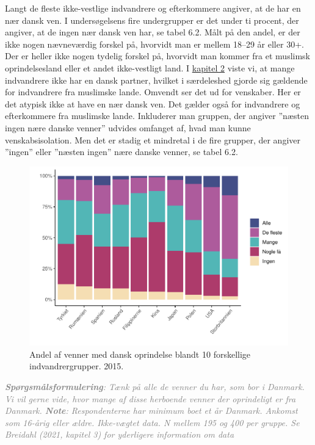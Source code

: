 \documentclass[
]{book}
\begin{document}
Langt de fleste ikke-vestlige indvandrere og efterkommere angiver, at de har en nær dansk ven. I undersøgelsens fire undergrupper er det under ti procent, der angiver, at de ingen nær dansk ven har, se tabel 6.2. Målt på den andel, er der ikke nogen nævneværdig forskel på, hvorvidt man er mellem 18--29 år eller 30+. Der er heller ikke nogen tydelig forskel på, hvorvidt man kommer fra et muslimsk oprindelsesland eller et andet ikke-vestligt land. I \hyperref[kap2]{kapitel 2} viste vi, at mange indvandrere ikke har en dansk partner, hvilket i særdeleshed gjorde sig gældende for indvandrere fra muslimske lande. Omvendt ser det ud for venskaber. Her er det atypisk ikke at have en nær dansk ven. Det gælder også for indvandrere og efterkommere fra muslimske lande. Inkluderer man gruppen, der angiver ''næsten ingen nære danske venner'' udvides omfanget af, hvad man kunne venskabsisolation. Men det er stadig et mindretal i de fire grupper, der angiver ''ingen'' eller ''næsten ingen'' nære danske venner, se tabel 6.2.

\newpage

\begin{figure}
\includegraphics[width=1\linewidth]{en-befolkning-blander-sig_files/figure-latex/fig-6-3-1} \caption{Andel af venner med dansk oprindelse blandt 10 forskellige indvandrergrupper. 2015.}\label{fig:fig-6-3}
\end{figure}

\begin{footnotesize}\textit{\textcolor{gray}{
\textit{\textbf{Spørgsmålsformulering}}: Tænk på alle de venner du har, som bor i Danmark. Vi vil gerne vide, hvor mange af disse herboende venner der oprindeligt er fra Danmark. \textit{\textbf{Note}}: Respondenterne har minimum boet et år Danmark. Ankomst som 16-årig eller ældre. Ikke-vægtet data. N mellem 195 og 400 per gruppe. Se Breidahl (2021, kapitel 3) for yderligere information om data
}}
\end{footnotesize}
\end{document}
